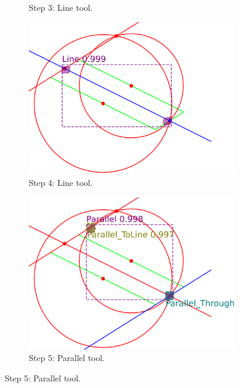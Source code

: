 \begin{figure}[htb!]
\begin{subfigure}[t]{0.32\textwidth}
         \caption{\small Step 3: Line tool.}
         \label{fig:Zeta06_example_step3}
     \end{subfigure}
     \hfill
     \begin{subfigure}[t]{0.32\textwidth}
         \centering
         \includegraphics[width=\textwidth]{img/Zeta-06_example/output_image3.png}
         \caption{\small Step 4: Line tool. }
         \label{fig:Zeta06_example_step4}
     \end{subfigure}
     \hfill
     \begin{subfigure}[t]{0.32\textwidth}
         \centering
         \includegraphics[width=\textwidth]{img/Zeta-06_example/output_image4.png}
         \caption{\small Step 5: Parallel tool.}
         \label{fig:Zeta06_example_step5}

\end{subfigure}
\end{figure}
